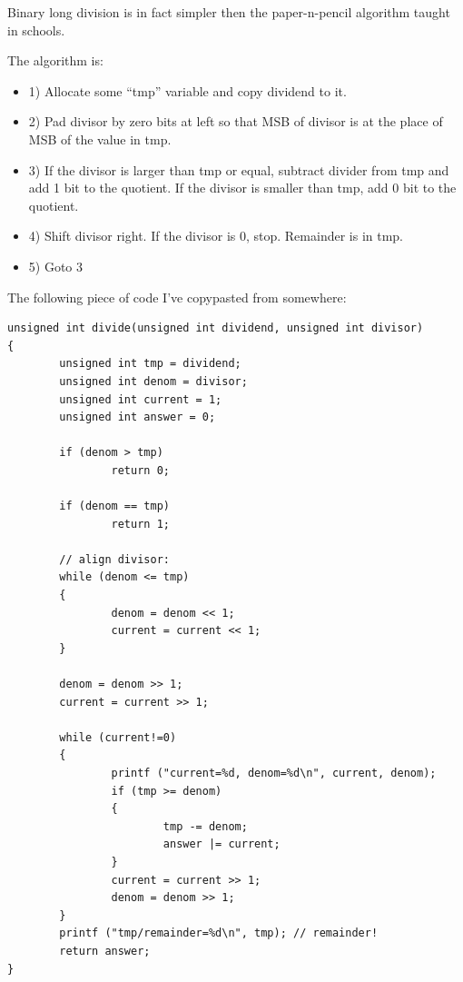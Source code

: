 Binary long division is in fact simpler then the paper-n-pencil algorithm taught in schools.

The algorithm is:

\begin{itemize}

\item 1) Allocate some ``tmp'' variable and copy dividend to it.

\item 2) Pad divisor by zero bits at left so that MSB of divisor is at the place of MSB of the value in tmp.

\item 3) If the divisor is larger than tmp or equal, subtract divider from tmp and add 1 bit to the quotient.
If the divisor is smaller than tmp, add 0 bit to the quotient.

\item 4) Shift divisor right.
If the divisor is 0, stop. Remainder is in tmp.

\item 5) Goto 3

\end{itemize}

The following piece of code I've copypasted from somewhere:

\begin{lstlisting}
unsigned int divide(unsigned int dividend, unsigned int divisor)
{
        unsigned int tmp = dividend;
        unsigned int denom = divisor;
        unsigned int current = 1;
        unsigned int answer = 0;

        if (denom > tmp)
                return 0;

        if (denom == tmp)
                return 1;

        // align divisor:
        while (denom <= tmp)
        {
                denom = denom << 1;
                current = current << 1;
        }

        denom = denom >> 1;
        current = current >> 1;

        while (current!=0)
        {
                printf ("current=%d, denom=%d\n", current, denom);
                if (tmp >= denom)
                {
                        tmp -= denom;
                        answer |= current;
                }
                current = current >> 1;
                denom = denom >> 1;
        }
        printf ("tmp/remainder=%d\n", tmp); // remainder!
        return answer;
}
\end{lstlisting}

